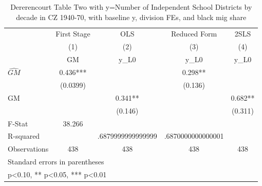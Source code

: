 \begin{table}[htbp]\centering
\def\sym#1{\ifmmode^{#1}\else\(^{#1}\)\fi}
\caption{Dererencourt Table Two with y=Number of Independent School Districts by decade in CZ 1940-70, with baseline y, division FEs, and black mig share}
\begin{tabular}{l*{4}{c}}
\toprule
                    & First Stage   &         OLS   &Reduced Form   &        2SLS   \\
                    &\multicolumn{1}{c}{(1)}&\multicolumn{1}{c}{(2)}&\multicolumn{1}{c}{(3)}&\multicolumn{1}{c}{(4)}\\
                    &\multicolumn{1}{c}{GM}&\multicolumn{1}{c}{y\_L0}&\multicolumn{1}{c}{y\_L0}&\multicolumn{1}{c}{y\_L0}\\
\midrule
$\hat{GM}$          &       0.436***&               &       0.298** &               \\
                    &    (0.0399)   &               &     (0.136)   &               \\
\addlinespace
GM                  &               &       0.341** &               &       0.682** \\
                    &               &     (0.146)   &               &     (0.311)   \\
\midrule
F-Stat              &      38.266   &               &               &               \\
R-squared           &               &.6879999999999999   &.6870000000000001   &               \\
Observations        &         438   &         438   &         438   &         438   \\
\bottomrule
\multicolumn{5}{l}{\footnotesize Standard errors in parentheses}\\
\multicolumn{5}{l}{\footnotesize * p<0.10, ** p<0.05, *** p<0.01}\\
\end{tabular}
\end{table}
